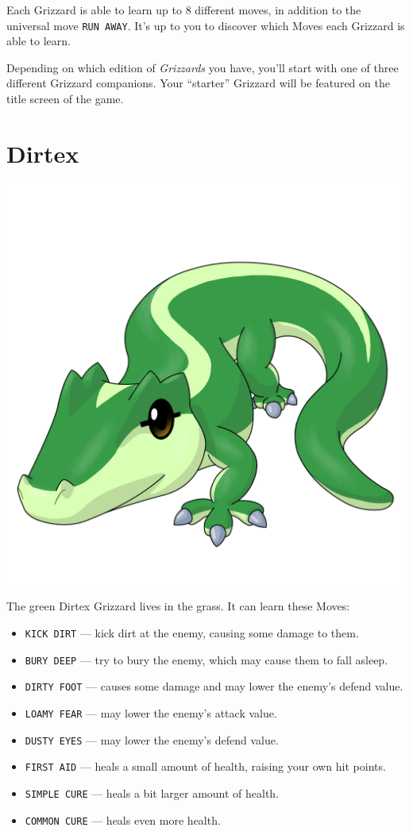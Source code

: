 \documentclass[10pt,twocolumn,openany,article]{memoir}
\begin{document}
\begin{description}
\fi

Each Grizzard is able  to learn up to 8 different  moves, in addition to
the universal move  \texttt{RUN AWAY}. It's up to you  to discover which
Moves each  Grizzard is  able to  learn.

\ifdefined\DEMO\else

Depending on which edition of  \textit{Grizzards} you have, you'll start
with  one  of  three  different Grizzard  companions.  Your  ``starter''
Grizzard will be featured on the title screen of the game.

\section{Dirtex}

\includegraphics[width=\columnwidth]{../Manual/Dirtex.png}

The green Dirtex Grizzard lives in the grass. It can learn these Moves:

\begin{itemize}
\item \texttt{KICK DIRT} --- kick dirt at the enemy, causing some damage
  to them.
\item \texttt{BURY DEEP} --- try to bury the enemy, which may cause them
  to fall asleep.
\item  \texttt{DIRTY FOOT}  --- causes  some  damage and  may lower  the
  enemy's defend value.
\item \texttt{LOAMY FEAR} --- may lower the enemy's attack value.
\item \texttt{DUSTY EYES} --- may lower the enemy's defend value.
\item \texttt{FIRST  AID} ---  heals a small  amount of  health, raising
  your own hit points.
\item \texttt{SIMPLE CURE} --- heals a bit larger amount of health.
\item \texttt{COMMON CURE} --- heals even more health.
\end{itemize}


\end{description}
\end{document}
